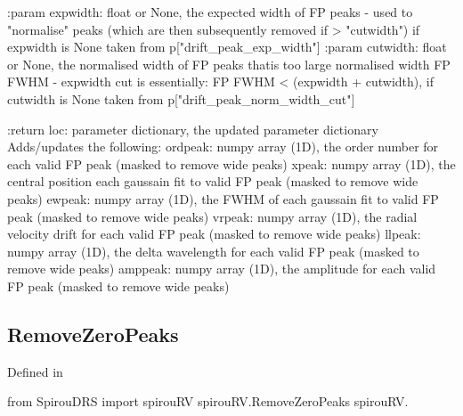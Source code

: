 \begin{minipage}{\textwidth}
\begin{pythondocstring}
:param expwidth: float or None, the expected width of FP peaks - used to
                 "normalise" peaks (which are then subsequently removed
                 if > "cutwidth") if expwidth is None taken from
                 p["drift_peak_exp_width"]
:param cutwidth: float or None, the normalised width of FP peaks thatis too
                 large normalised width FP FWHM - expwidth
                 cut is essentially: FP FWHM < (expwidth + cutwidth), if
                 cutwidth is None taken from p["drift_peak_norm_width_cut"]

:return loc: parameter dictionary, the updated parameter dictionary
        Adds/updates the following:
            ordpeak: numpy array (1D), the order number for each valid FP
                     peak (masked to remove wide peaks)
            xpeak: numpy array (1D), the central position each gaussain fit
                   to valid FP peak (masked to remove wide peaks)
            ewpeak: numpy array (1D), the FWHM of each gaussain fit
                    to valid FP peak (masked to remove wide peaks)
            vrpeak: numpy array (1D), the radial velocity drift for each
                    valid FP peak (masked to remove wide peaks)
            llpeak: numpy array (1D), the delta wavelength for each valid
                    FP peak (masked to remove wide peaks)
            amppeak: numpy array (1D), the amplitude for each valid FP peak
                     (masked to remove wide peaks)
\end{pythondocstring}
\end{minipage}

\noindent\begin{minipage}{\textwidth}
\subsection{RemoveZeroPeaks}

Defined in \spirouRV{}

\begin{pythonbox}
from SpirouDRS import spirouRV
spirouRV.RemoveZeroPeaks
spirouRV.
\end{pythonbox}

\begin{pythondocstring}

\end{pythondocstring}
\end{minipage}


